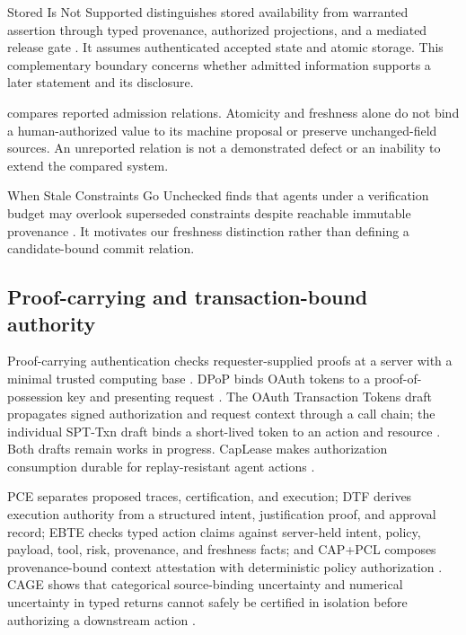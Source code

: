 Stored Is Not Supported distinguishes stored availability from warranted assertion through typed provenance, authorized projections, and a mediated release gate \citep{he2026stored}. It assumes authenticated accepted state and atomic storage. This complementary boundary concerns whether admitted information supports a later statement and its disclosure.

 compares reported admission relations. Atomicity and freshness alone do not bind a human-authorized value to its machine proposal or preserve unchanged-field sources. An unreported relation is not a demonstrated defect or an inability to extend the compared system.

When Stale Constraints Go Unchecked finds that agents under a verification budget may overlook superseded constraints despite reachable immutable provenance \citep{nakayashiki2026staleconstraints}. It motivates our freshness distinction rather than defining a candidate-bound commit relation.



\subsection{Proof-carrying and transaction-bound authority}

Proof-carrying authentication checks requester-supplied proofs at a server with a minimal trusted computing base \citep{appel1999pca}. DPoP binds OAuth tokens to a proof-of-possession key and presenting request \citep{fett2023dpop}. The OAuth Transaction Tokens draft propagates signed authorization and request context through a call chain; the individual SPT-Txn draft binds a short-lived token to an action and resource \citep{tulshibagwale2026txtokens,coetzee2026spttxn}. Both drafts remain works in progress. CapLease makes authorization consumption durable for replay-resistant agent actions \citep{xu2026caplease}.

PCE separates proposed traces, certification, and execution; DTF derives execution authority from a structured intent, justification proof, and approval record; EBTE checks typed action claims against server-held intent, policy, payload, tool, risk, provenance, and freshness facts; and CAP+PCL composes provenance-bound context attestation with deterministic policy authorization \citep{liu2026pce,he2026dtf,zhu2026ebte,chitan2026cappcl}. CAGE shows that categorical source-binding uncertainty and numerical uncertainty in typed returns cannot safely be certified in isolation before authorizing a downstream action \citep{delattre2026cage}.

